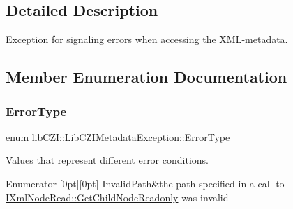 \subsection{Detailed Description}
Exception for signaling errors when accessing the X\+M\+L-\/metadata. 

\subsection{Member Enumeration Documentation}
\mbox{\label{classlib_c_z_i_1_1_lib_c_z_i_metadata_exception_a60fe07e00ad32f331a85aafedec72242}} 
\subsubsection{\texorpdfstring{Error\+Type}{ErrorType}}
{\footnotesize\ttfamily enum \hyperlink{classlib_c_z_i_1_1_lib_c_z_i_metadata_exception_a60fe07e00ad32f331a85aafedec72242}{lib\+C\+Z\+I\+::\+Lib\+C\+Z\+I\+Metadata\+Exception\+::\+Error\+Type}\hspace{0.3cm}{\ttfamily [strong]}}



Values that represent different error conditions. 

\begin{DoxyEnumFields}{Enumerator}
[0pt][0pt]{}\mbox{\label{classlib_c_z_i_1_1_lib_c_z_i_metadata_exception_a60fe07e00ad32f331a85aafedec72242a5d0744802b24f44a161d350c25d76c7b}} 
Invalid\+Path&the path specified in a call to \hyperlink{classlib_c_z_i_1_1_i_xml_node_read_a4e14de646b5624daf11b16ba42094c74}{I\+Xml\+Node\+Read\+::\+Get\+Child\+Node\+Readonly} was invalid \\
\hline

\end{DoxyEnumFields}


